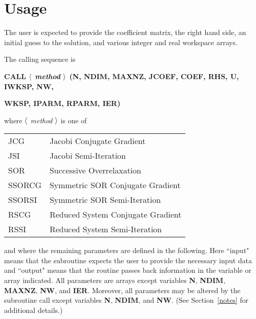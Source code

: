 \section{Usage} 
\label{usage}
 
The user is expected to provide the coefficient matrix, the right hand
side, an initial guess to the solution, and various integer and real
workspace arrays.
 
The calling sequence is

\bigskip
\centerline{\bf CALL $\langle$ {\em method} $\rangle$ (N, NDIM, MAXNZ, JCOEF, COEF, 
              RHS, U, IWKSP, NW,}
\centerline{\bf WKSP, IPARM, RPARM, IER)}
\bigskip
 
\noindent
where $\langle$ {\em method} $\rangle$ is one of 

\bigskip
\begin{tabular}{ll} \hline
  JCG    & Jacobi Conjugate Gradient \\
  JSI    & Jacobi Semi-Iteration \\
  SOR    & Successive Overrelaxation \\
  SSORCG & Symmetric SOR Conjugate Gradient \\
  SSORSI & Symmetric SOR Semi-Iteration \\
  RSCG   & Reduced System Conjugate Gradient \\
  RSSI   & Reduced System Semi-Iteration \\ \hline
\end{tabular} 
\bigskip

\noindent
and where the remaining parameters are defined in the following.  Here 
``input" means that the subroutine expects the user to provide the 
necessary input data and ``output" means that the routine passes back 
information in the variable or array indicated.  All parameters are 
arrays except variables {\bf N}, {\bf NDIM}, {\bf MAXNZ}, 
{\bf NW}, and {\bf IER}.  Moreover, all parameters may be altered by 
the subroutine call except variables {\bf N}, {\bf NDIM}, and {\bf NW}.
(See Section~\ref{notes} for additional details.)

